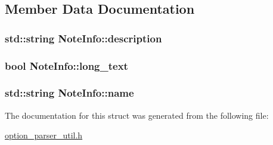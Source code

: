 \subsection{Member Data Documentation}
\hypertarget{structNoteInfo_ac5223560c1af0c8caf6c0351d9220496}{
\subsubsection[{description}]{\setlength{\rightskip}{0pt plus 5cm}std\-::string Note\-Info\-::description}}\label{structNoteInfo_ac5223560c1af0c8caf6c0351d9220496}
\hypertarget{structNoteInfo_a03ad213e8b2a53efb0ea37faee40b9e5}{
\subsubsection[{long\-\_\-text}]{\setlength{\rightskip}{0pt plus 5cm}bool Note\-Info\-::long\-\_\-text}}\label{structNoteInfo_a03ad213e8b2a53efb0ea37faee40b9e5}
\hypertarget{structNoteInfo_ab75eee917bd6be0c451f3ba92daa577a}{
\subsubsection[{name}]{\setlength{\rightskip}{0pt plus 5cm}std\-::string Note\-Info\-::name}}\label{structNoteInfo_ab75eee917bd6be0c451f3ba92daa577a}


The documentation for this struct was generated from the following file\-:\begin{DoxyCompactItemize}
\item 
\hyperlink{option__parser__util_8h}{option\-\_\-parser\-\_\-util.\-h}\end{DoxyCompactItemize}
